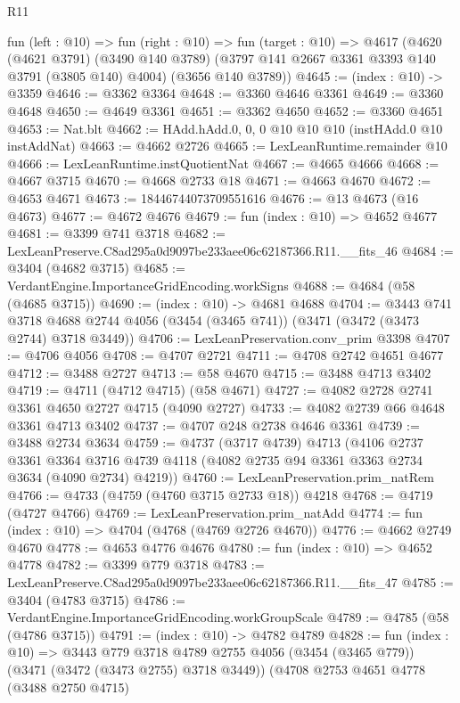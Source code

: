 \begin{lexlean}{R11}
\begin{coremodule}
  fun (left : @10) =>
  fun (right : @10) =>
  fun (target : @10) =>
  @4617
    (@4620
      (@4621 @3791)
      (@3490 @140 @3789)
      (@3797 @141 @2667 @3361 @3393 @140 @3791 (@3805 @140) @4004)
      (@3656 @140 @3789))
@4645 := (index : @10) -> @3359
@4646 := @3362 @3364
@4648 := @3360 @4646 @3361
@4649 := @3360 @4648
@4650 := @4649 @3361
@4651 := @3362 @4650
@4652 := @3360 @4651
@4653 := Nat.blt
@4662 := HAdd.hAdd.{0, 0, 0} @10 @10 @10 (instHAdd.{0} @10 instAddNat)
@4663 := @4662 @2726
@4665 := LexLeanRuntime.remainder @10
@4666 := LexLeanRuntime.instQuotientNat
@4667 := @4665 @4666
@4668 := @4667 @3715
@4670 := @4668 @2733 @18
@4671 := @4663 @4670
@4672 := @4653 @4671
@4673 := 18446744073709551616
@4676 := @13 @4673 (@16 @4673)
@4677 := @4672 @4676
@4679 := fun (index : @10) => @4652 @4677
@4681 := @3399 @741 @3718
@4682 := LexLeanPreserve.C8ad295a0d9097be233aee06c62187366.R11.__fits_46
@4684 := @3404 (@4682 @3715)
@4685 := VerdantEngine.ImportanceGridEncoding.workSigns
@4688 := @4684 (@58 (@4685 @3715))
@4690 := (index : @10) -> @4681 @4688
@4704 := @3443
    @741
    @3718
    @4688
    @2744
    @4056
    (@3454 (@3465 @741))
    (@3471 (@3472 (@3473 @2744) @3718 @3449))
@4706 := LexLeanPreservation.conv_prim @3398
@4707 := @4706 @4056
@4708 := @4707 @2721
@4711 := @4708 @2742 @4651 @4677
@4712 := @3488 @2727
@4713 := @58 @4670
@4715 := @3488 @4713 @3402
@4719 := @4711 (@4712 @4715) (@58 @4671)
@4727 := @4082 @2728 @2741 @3361 @4650 @2727 @4715 (@4090 @2727)
@4733 := @4082 @2739 @66 @4648 @3361 @4713 @3402
@4737 := @4707 @248 @2738 @4646 @3361
@4739 := @3488 @2734 @3634
@4759 := @4737
    (@3717 @4739)
    @4713
    (@4106
      @2737
      @3361
      @3364
      @3716
      @4739
      @4118
      (@4082 @2735 @94 @3361 @3363 @2734 @3634 (@4090 @2734) @4219))
@4760 := LexLeanPreservation.prim_natRem
@4766 := @4733 (@4759 (@4760 @3715 @2733 @18)) @4218
@4768 := @4719 (@4727 @4766)
@4769 := LexLeanPreservation.prim_natAdd
@4774 := fun (index : @10) => @4704 (@4768 (@4769 @2726 @4670))
@4776 := @4662 @2749 @4670
@4778 := @4653 @4776 @4676
@4780 := fun (index : @10) => @4652 @4778
@4782 := @3399 @779 @3718
@4783 := LexLeanPreserve.C8ad295a0d9097be233aee06c62187366.R11.__fits_47
@4785 := @3404 (@4783 @3715)
@4786 := VerdantEngine.ImportanceGridEncoding.workGroupScale
@4789 := @4785 (@58 (@4786 @3715))
@4791 := (index : @10) -> @4782 @4789
@4828 := fun (index : @10) =>
  @3443
    @779
    @3718
    @4789
    @2755
    @4056
    (@3454 (@3465 @779))
    (@3471 (@3472 (@3473 @2755) @3718 @3449))
    (@4708
      @2753
      @4651
      @4778
      (@3488 @2750 @4715)

\end{coremodule}
\end{lexlean}
